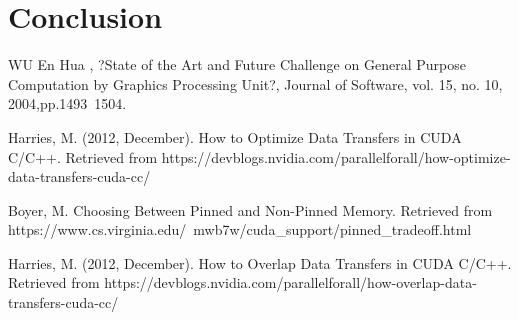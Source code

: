 \documentclass[journal,12pt,onecolumn,draftclsnofoot]{ieeeconf}  %
\begin{document}
\section{Conclusion} 


\begin{thebibliography}{9}
WU En Hua , ?State of the Art and Future Challenge on General 
Purpose Computation by Graphics Processing Unit?, Journal of 
Software, vol. 15, no. 10, 2004,pp.1493~1504.

Harries, M. (2012, December). How to Optimize Data Transfers in CUDA C/C++. Retrieved from https://devblogs.nvidia.com/parallelforall/how-optimize-data-transfers-cuda-cc/
	
Boyer, M. Choosing Between Pinned and Non-Pinned Memory. Retrieved from https://www.cs.virginia.edu/~mwb7w/cuda_support/pinned_tradeoff.html
	
Harries, M. (2012, December). How to Overlap Data Transfers in CUDA C/C++. Retrieved from https://devblogs.nvidia.com/parallelforall/how-overlap-data-transfers-cuda-cc/
	

\end{thebibliography}
\end{document}
